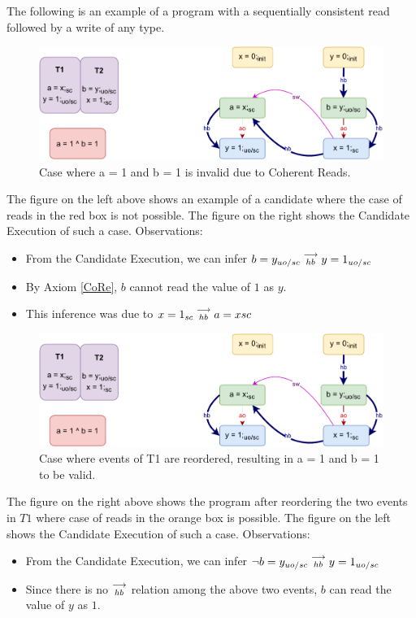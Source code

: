         The following is an example of a program with a sequentially consistent read followed by a write of any type. 
        \begin{figure}[H]
            \centering
            \includegraphics[scale=0.7]{InstructionReordering/Example3(Rsc-Wuo,sc).pdf}
            \caption{Case where a = 1 and b = 1 is invalid due to Coherent Reads.}
        \end{figure}
        The figure on the left above shows an example of a candidate where the case of reads in the red box is not possible. 
        The figure on the right shows the Candidate Execution of such a case. 
        Observations:
        \begin{itemize}
            \item From the Candidate Execution, we can infer $b=y_{uo/sc}\stackrel{\longrightarrow}{_{hb}}y=1_{uo/sc}$
            \item By Axiom \ref{CoRe}, $b$ cannot read the value of $1$ as $y$. 
            \item This inference was due to $x=1_{sc}\stackrel{\longrightarrow}{_{hb}}a=x{sc}$
        \end{itemize}

        \begin{figure}[H]
            \centering
            \includegraphics[scale=0.7]{InstructionReordering/Example3(Rsc-Wuo,sc).pdf}
            \caption{Case where events of T1 are reordered, resulting in  a = 1 and b = 1 to be valid.}
        \end{figure}
        The figure on the right above shows the program after reordering the two events in $T1$ where case of reads in the orange box is possible. 
        The figure on the left shows the Candidate Execution of such a case. 
        Observations:
        \begin{itemize}
            \item From the Candidate Execution, we can infer $\neg b=y_{uo/sc}\stackrel{\longrightarrow}{_{hb}}y=1_{uo/sc}$
            \item Since there is no $\stackrel{\longrightarrow}{_{hb}}$ relation among the above two events, $b$ can read the value of $y$ as $1$.
        \end{itemize}

